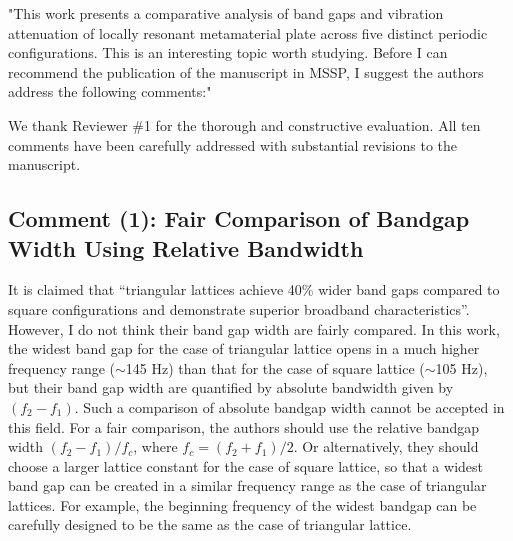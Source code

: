 \documentclass[11pt,a4paper]{article}
\newenvironment{reviewerbox}{%
    \par\medskip\noindent{\color{reviewercolor}\rule{\linewidth}{2pt}}\par
    \noindent{\color{reviewercolor}\bfseries Reviewer Comment}\par\smallskip
}{%
    \par\noindent{\color{reviewercolor}\rule{\linewidth}{0.5pt}}\medskip
}
\begin{document}
"This work presents a comparative analysis of band gaps and vibration attenuation of locally resonant metamaterial plate across five distinct periodic configurations. This is an interesting topic worth studying. Before I can recommend the publication of the manuscript in MSSP, I suggest the authors address the following comments:"

We thank Reviewer \#1 for the thorough and constructive evaluation. All ten comments have been carefully addressed with substantial revisions to the manuscript.

\subsection*{Comment (1): Fair Comparison of Bandgap Width Using Relative Bandwidth}

\begin{reviewerbox}
It is claimed that ``triangular lattices achieve 40\% wider band gaps compared to square configurations and demonstrate superior broadband characteristics''. However, I do not think their band gap width are fairly compared. In this work, the widest band gap for the case of triangular lattice opens in a much higher frequency range ($\sim$145 Hz) than that for the case of square lattice ($\sim$105 Hz), but their band gap width are quantified by absolute bandwidth given by $(f_2-f_1)$. Such a comparison of absolute bandgap width cannot be accepted in this field. For a fair comparison, the authors should use the relative bandgap width $(f_2-f_1)/f_c$, where $f_c=(f_2+f_1)/2$. Or alternatively, they should choose a larger lattice constant for the case of square lattice, so that a widest band gap can be created in a similar frequency range as the case of triangular lattices. For example, the beginning frequency of the widest bandgap can be carefully designed to be the same as the case of triangular lattice.
\end{reviewerbox}
\end{document}
